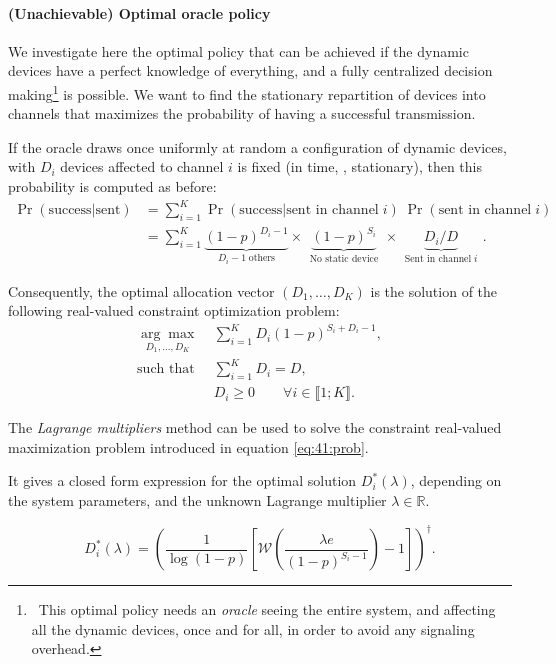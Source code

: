 \paragraph{(Unachievable) Optimal oracle policy}

We investigate here the optimal policy that can be achieved if the dynamic devices have a perfect knowledge of everything, and a fully centralized decision making\footnote{~This optimal policy needs an \emph{oracle} seeing the entire system, and affecting all the dynamic devices, once and for all, in order to avoid any signaling overhead.} is possible.
We want to find the stationary repartition of devices into channels that maximizes the probability of having a successful transmission.

If the oracle draws once uniformly at random a configuration of dynamic devices, with $D_i$ devices affected to channel $i$ is fixed (in time, \ie, stationary),
then this probability is computed as before:
\begin{align}\label{eq:41:prob_col}
    \Pr(\text{success}|\text{sent})
    & = \sum_{i=1}^{K} \Pr(\text{success}|\text{sent in channel}\;i) \; \Pr(\text{sent in channel}\;i) \nonumber \\
    & = \sum_{i=1}^{K} \underbrace{(1 - p)^{D_i - 1}}_{\;\;D_i - 1 \;\text{others}\;\;} \times \underbrace{(1 - p)^{S_i}}_{\;\;\text{No static device}\;\;} \times \underbrace{ D_i / D }_{\;\;\text{Sent in channel}\; i\;\;}.
\end{align}

Consequently, the optimal allocation vector $(D_1,\dots,D_{K})$ is the solution of the following real-valued constraint optimization problem:
%
\begin{subequations}\label{eq:41:prob}
\begin{align}
    \underset{D_1,\dots,D_{K}}{\arg\max}\; & \sum_{i=1}^{K} D_i (1 - p)^{S_i + D_i -1}, \label{eq:41:optPb}\\
    \text{such that}\;\; & \sum_{i=1}^{K} D_i = D, \label{eq:41:eqCstr}\\
    & D_i \geq 0 \qquad \forall i\in\llbracket 1;K\rrbracket . \label{eq:41:ineqCstr}
\end{align}
\end{subequations}

\begin{proposition}\label{prop:41:Lagrangian}
    The \emph{Lagrange multipliers} method \cite{BoydVanderberghe04} can be used to solve the constraint real-valued maximization problem introduced in equation \eqref{eq:41:prob}.

    It gives a closed form expression for the optimal solution $D_i^*(\lambda)$, depending on the system parameters, and the unknown Lagrange multiplier $\lambda \in \mathbb{R}$.

    \begin{equation}\label{eq:41:Dilambda}
        D_i^*(\lambda) = \left(\frac{1}{\log(1-p)}\left[ \mathcal{W}\left(\frac{\lambda e}{(1-p)^{S_i-1}} \right)-1 \right]\right)^{\dag} .
    \end{equation}
\end{proposition}


